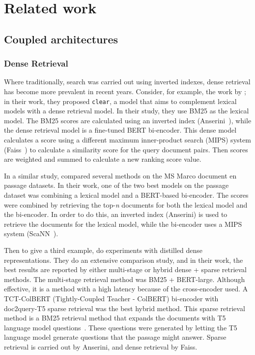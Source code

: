 
\section{Related work }
\subsection{Coupled architectures}

\subsubsection{Dense Retrieval}
Where traditionally, search was carried out using inverted indexes, dense retrieval has become more prevalent in recent years. Consider, for example, the work by \citet{dense-retrieval-1}; in their work, they proposed \texttt{clear}, a model that aims to complement lexical models with a dense retrieval model. In their study, they use BM25 as the lexical model. The BM25 scores are calculated using an inverted index (Anserini~\citep{anserini}), while the dense retrieval model is a fine-tuned BERT bi-encoder. This dense model calculates a score using a different maximum inner-product search (MIPS) system (Faiss~\citep{faiss}) to calculate a similarity score for the query document pairs. Then scores are weighted and summed to calculate a new ranking score value. 

In a similar study, \citet{dense-retrieval-2} compared several methods on the MS Marco document en passage datasets. In their work, one of the two best models on the passage dataset was combining a lexical model and a BERT-based bi-encoder. The scores were combined by retrieving the top-\textit{n} documents for both the lexical model and the bi-encoder. In order to do this, an inverted index (Anserini) is used to retrieve the documents for the lexical model, while the bi-encoder uses a MIPS system (ScaNN~\citep{scann}).

Then to give a third example, \citet{dense-retrieval-3} do experiments with distilled dense representations. They do an extensive comparison study, and in their work, the best results are reported by either multi-stage or hybrid dense + sparse retrieval methods. The multi-stage retrieval method was BM25 + BERT-large. Although effective, it is a method with a high latency because of the cross-encoder used. A TCT-ColBERT (Tightly-Coupled Teacher - ColBERT) bi-encoder with doc2query-T5 sparse retrieval was the best hybrid method. This sparse retrieval method is a BM25 retrieval method that expands the documents with T5 language model questions~\citep{2020t5}. These questions were generated by letting the T5 language model generate questions that the passage might answer. Sparse retrieval is carried out by Anserini, and dense retrieval by Faiss. 


